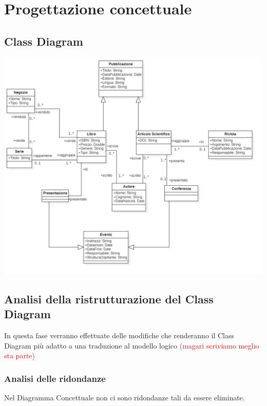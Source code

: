 \chapter{Progettazione concettuale}
    \section{Class Diagram}

    \includegraphics[scale=0.3]{Immagini/UML_v1_0.png}
        
    \section{Analisi della ristrutturazione del Class Diagram}
        In questa fase verranno effettuate delle modifiche che renderanno il Class Diagram
        più adatto a una traduzione al modello logico \textcolor{red}{(magari scriviamo meglio sta parte)}
        \subsection{Analisi delle ridondanze}
        Nel Diagramma Concettuale non ci sono ridondanze tali da essere eliminate.
